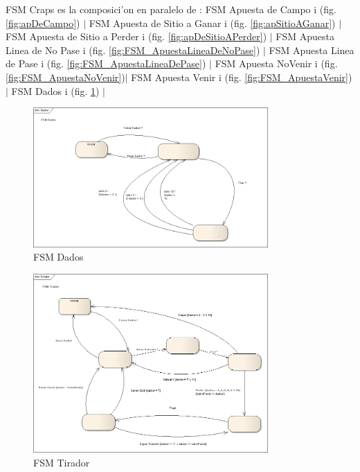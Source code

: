 FSM Craps es la composici'on en paralelo de : 
FSM Apuesta de Campo i (fig. \ref{fig:apDeCampo}) $|$ 
FSM Apuesta de Sitio a Ganar i (fig. \ref{fig:apSitioAGanar}) $|$
FSM Apuesta de Sitio a Perder i (fig. \ref{fig:apDeSitioAPerder}) $|$
FSM Apuesta Linea de No Pase i (fig. \ref{fig:FSM_ApuestaLineaDeNoPase}) $|$
FSM Apuesta Linea de Pase i (fig. \ref{fig:FSM_ApuestaLineaDePase}) $|$
FSM Apuesta NoVenir i (fig. \ref{fig:FSM_ApuestaNoVenir})$|$
FSM Apuesta Venir i (fig. \ref{fig:FSM_ApuestaVenir}) $|$
FSM Dados i (fig. \ref{fig:FSM_Dados}) $|$


        \begin{figure}[p!hbt]
		\centering
		\includegraphics[angle=0, width=0.8\textwidth]{../img/FSM_Dados.png}
		\caption{FSM Dados }
		\label{fig:FSM_Dados}
	\end{figure}

        \begin{figure}[p!hbt]
		\centering
		\includegraphics[angle=0, width=0.8\textwidth ]{../img/FSM_Tirador.png}
		\caption{FSM Tirador }
		\label{fig:fsmtirador}
	\end{figure}


